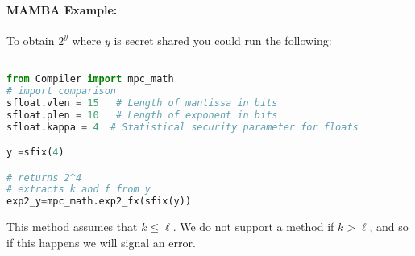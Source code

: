 \paragraph{MAMBA Example:} To obtain $2^y$ where $y$ is secret shared you could run the following: 
\begin{lstlisting}[language={python}]

from Compiler import mpc_math
# import comparison
sfloat.vlen = 15   # Length of mantissa in bits
sfloat.plen = 10   # Length of exponent in bits
sfloat.kappa = 4  # Statistical security parameter for floats

y =sfix(4)

# returns 2^4 
# extracts k and f from y
exp2_y=mpc_math.exp2_fx(sfix(y))
\end{lstlisting}

This method assumes that $k \le \ell$.
We do not support a method if $k > \ell$, and so if this happens
we will signal an error.
